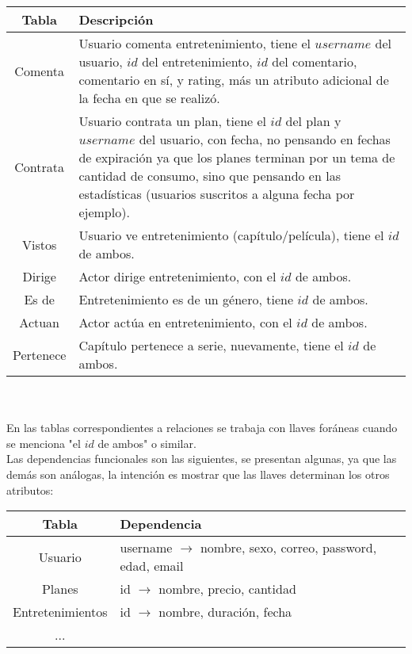 \documentclass[letter]{article}
\begin{document}
\begin{pregunta}{1}
		\begin{tabular}{ c|p{12cm} }
			Tabla & Descripción\\
			\hline
			Comenta & Usuario comenta entretenimiento, tiene el $username$ del usuario, $id$ del entretenimiento, $id$ del comentario, comentario en sí, y rating, más un atributo adicional de la fecha en que se realizó.\\
			\hline
			Contrata & Usuario contrata un plan, tiene el $id$ del plan y $username$ del usuario, con fecha, no pensando en fechas de expiración ya que los planes terminan por un tema de cantidad de consumo, sino que pensando en las estadísticas (usuarios suscritos a alguna fecha por ejemplo).\\
			\hline
			Vistos & Usuario ve entretenimiento (capítulo/película), tiene el $id$ de ambos.\\
			\hline
			Dirige & Actor dirige entretenimiento, con el $id$ de ambos.\\
			\hline
			Es de & Entretenimiento es de un género, tiene $id$ de ambos.\\
			\hline
			Actuan & Actor actúa en entretenimiento, con el $id$ de ambos.\\
			\hline
			Pertenece & Capítulo pertenece a serie, nuevamente, tiene el $id$ de ambos.\\
		\end{tabular}\\ \\

		En las tablas correspondientes a relaciones se trabaja con llaves foráneas cuando se menciona "el $id$ de ambos" o similar. \\

		Las dependencias funcionales son las siguientes, se presentan algunas, ya que las demás son análogas, la intención es mostrar que las llaves determinan los otros atributos: \\

		\begin{tabular}{ c|p{12cm} }
			Tabla & Dependencia\\
			\hline
			Usuario & username $\rightarrow$ nombre, sexo, correo, password, edad, email\\
			\hline
			Planes & id $\rightarrow$ nombre, precio, cantidad\\
			\hline
			Entretenimientos & id $\rightarrow$ nombre, duración, fecha\\
			\hline
			...\\
		\end{tabular}\\ \\


\end{pregunta}
\end{document}
